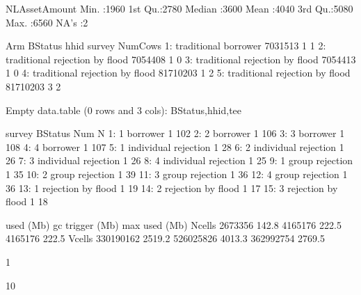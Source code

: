 \begin{Schunk}
\begin{Soutput}
 NLAssetAmount 
 Min.   :1960  
 1st Qu.:2780  
 Median :3600  
 Mean   :4040  
 3rd Qu.:5080  
 Max.   :6560  
 NA's   :2     
\end{Soutput}
\begin{Soutput}
           Arm            BStatus     hhid survey NumCows
1: traditional           borrower  7031513      1       1
2: traditional rejection by flood  7054408      1       0
3: traditional rejection by flood  7054413      1       0
4: traditional rejection by flood 81710203      1       2
5: traditional rejection by flood 81710203      3       2
\end{Soutput}
\begin{Soutput}
Empty data.table (0 rows and 3 cols): BStatus,hhid,tee
\end{Soutput}
\begin{Soutput}
    survey              BStatus Num   N
 1:      1             borrower   1 102
 2:      2             borrower   1 106
 3:      3             borrower   1 108
 4:      4             borrower   1 107
 5:      1 individual rejection   1  28
 6:      2 individual rejection   1  26
 7:      3 individual rejection   1  26
 8:      4 individual rejection   1  25
 9:      1      group rejection   1  35
10:      2      group rejection   1  39
11:      3      group rejection   1  36
12:      4      group rejection   1  36
13:      1   rejection by flood   1  19
14:      2   rejection by flood   1  17
15:      3   rejection by flood   1  18
\end{Soutput}
\begin{Soutput}
            used   (Mb) gc trigger   (Mb)  max used   (Mb)
Ncells   2673356  142.8    4165176  222.5   4165176  222.5
Vcells 330190162 2519.2  526025826 4013.3 362992754 2769.5
\end{Soutput}
\begin{Soutput}
[1] 1
\end{Soutput}
\begin{Soutput}
[1] 10
\end{Soutput}
\begin{Soutput}
Warning in rbind(c("", "&", rbind(paste0("\\makebox[", hcenter, unit, "]{", : number of columns of result is not a multiple of vector length (arg 1)
\end{Soutput}
\begin{Soutput}
Warning in rbind(c("", "&", rbind(paste0("\\makebox[", hcenter, unit, "]{", : number of columns of result is not a multiple of vector length (arg 1)
\end{Soutput}
\begin{Soutput}
Warning in rbind(c("", "&", rbind(paste0("\\makebox[", hcenter, unit, "]{", : number of columns of result is not a multiple of vector length (arg 1)
\end{Soutput}
\end{Schunk}

